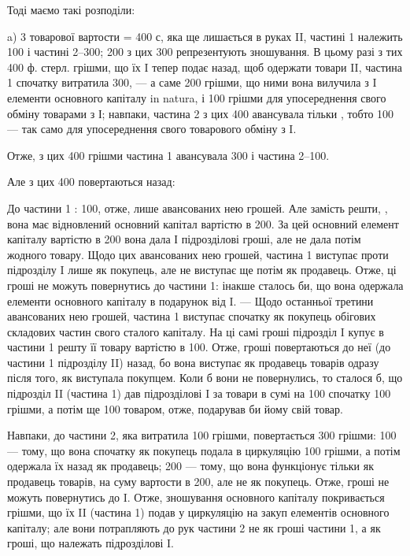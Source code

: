 Тоді маємо такі розподіли:

a) 3 товарової вартости = 400 с, яка ще лишається в руках II, частині
1 належить 100 і частині 2--300; 200 з цих 300 репрезентують
зношування. В цьому разі з тих 400 ф. стерл. грішми, що їх I тепер
подає назад, щоб одержати товари II, частина 1 спочатку витратила 300,
— а саме 200 грішми, що ними вона вилучила з I елементи основного
капіталу in natura, і 100 грішми для упосереднення свого обміну товарами
з І; навпаки, частина 2 з цих 400 авансувала тільки , тобто
100 — так само для упосереднення свого товарового обміну з I.

Отже, з цих 400 грішми частина 1 авансувала 300 і частина
2--100.

Але з цих 400 повертаються назад:

До частини 1 : 100, отже, лише  авансованих нею грошей. Але
замість решти, , вона має відновлений основний капітал вартістю в 200.
За цей основний елемент капіталу вартістю в 200 вона дала І підрозділові
гроші, але не дала потім жодного товару. Щодо цих 
авансованих нею грошей, частина 1 виступає проти підрозділу I лише як
покупець, але не виступає ще потім як продавець. Отже, ці гроші
не можуть повернутись до частини 1: інакше сталось би, що вона одержала
елементи основного капіталу в подарунок від I. — Щодо останньої
третини авансованих нею грошей, частина 1 виступає спочатку
як покупець обігових складових частин свого сталого капіталу. На ці
самі гроші підрозділ I купує в частини 1 решту її товару вартістю
в 100. Отже, гроші повертаються до неї (до частини 1 підрозділу II)
назад, бо вона виступає як продавець товарів одразу після того, як
виступала покупцем. Коли б вони не повернулись, то сталося б, що
підрозділ II (частина 1) дав підрозділові I за товари в сумі на 100 спочатку
100 грішми, а потім ще 100 товаром, отже, подарував би йому
свій товар.

Навпаки, до частини 2, яка витратила 100 грішми, повертається
300 грішми: 100 — тому, що вона спочатку як покупець подала в циркуляцію
100 грішми, а потім одержала їх назад як продавець; 200 —
тому, що вона функціонує тільки як продавець товарів, на суму вартости
в 200, але не як покупець. Отже, гроші не можуть повернутись до I.
Отже, зношування основного капіталу покривається грішми, що їх II
(частина 1) подав у циркуляцію на закуп елементів основного капіталу;
але вони потрапляють до рук частини 2 не як гроші частини 1, а як
гроші, що належать підрозділові I.

